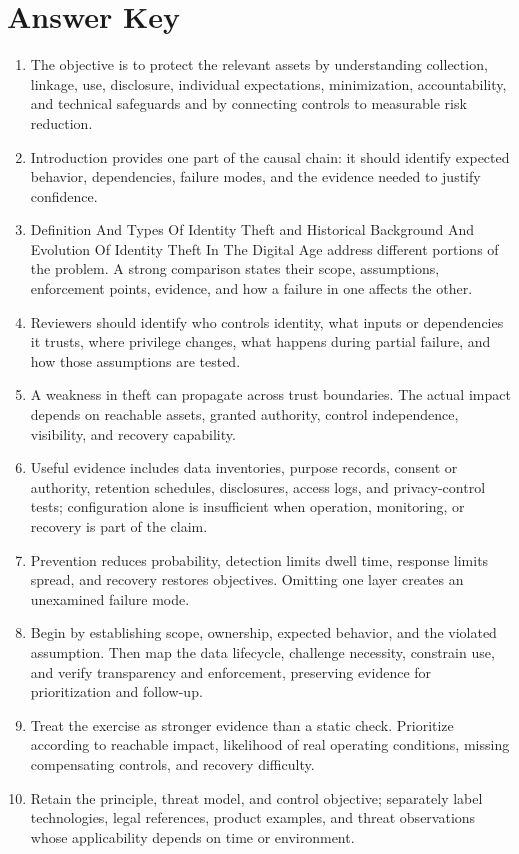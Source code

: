 \documentclass[11pt,letterpaper]{article}
\begin{document}
\section*{Answer Key}
\begin{enumerate}
\item The objective is to protect the relevant assets by understanding collection, linkage, use, disclosure, individual expectations, minimization, accountability, and technical safeguards and by connecting controls to measurable risk reduction.
\item Introduction provides one part of the causal chain: it should identify expected behavior, dependencies, failure modes, and the evidence needed to justify confidence.
\item Definition And Types Of Identity Theft and Historical Background And Evolution Of Identity Theft In The Digital Age address different portions of the problem. A strong comparison states their scope, assumptions, enforcement points, evidence, and how a failure in one affects the other.
\item Reviewers should identify who controls identity, what inputs or dependencies it trusts, where privilege changes, what happens during partial failure, and how those assumptions are tested.
\item A weakness in theft can propagate across trust boundaries. The actual impact depends on reachable assets, granted authority, control independence, visibility, and recovery capability.
\item Useful evidence includes data inventories, purpose records, consent or authority, retention schedules, disclosures, access logs, and privacy-control tests; configuration alone is insufficient when operation, monitoring, or recovery is part of the claim.
\item Prevention reduces probability, detection limits dwell time, response limits spread, and recovery restores objectives. Omitting one layer creates an unexamined failure mode.
\item Begin by establishing scope, ownership, expected behavior, and the violated assumption. Then map the data lifecycle, challenge necessity, constrain use, and verify transparency and enforcement, preserving evidence for prioritization and follow-up.
\item Treat the exercise as stronger evidence than a static check. Prioritize according to reachable impact, likelihood of real operating conditions, missing compensating controls, and recovery difficulty.
\item Retain the principle, threat model, and control objective; separately label technologies, legal references, product examples, and threat observations whose applicability depends on time or environment.
\end{enumerate}
\end{document}
